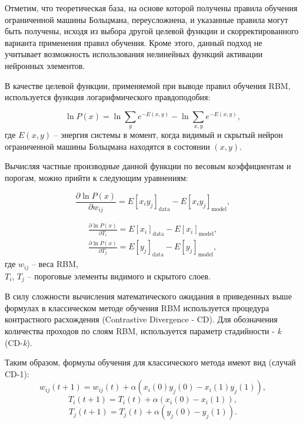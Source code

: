 \documentclass{thesisby}
\begin{document}
Отметим, что теоретическая база, на основе которой получены правила обучения ограниченной машины Больцмана, переусложнена, и указанные правила могут быть получены, исходя из выбора другой целевой функции и скорректированного варианта применения правил обучения. Кроме этого, данный подход не учитывает возможность использования нелинейных функций активации нейронных элементов.

В качестве целевой функции, применяемой при выводе правил обучения RBM, используется функция логарифмического правдоподобия:
 
\begin{equation*}
    \ln{P(x)} = \ln{\sum_y e^{-E(x, y)}} - \ln{\sum_{x,y} e^{-E(x, y)}},
\end{equation*}
где $E(x, y)$ -- энергия системы в момент, когда видимый и скрытый нейрон ограниченной машины Больцмана находятся в состоянии $(x, y)$.
	
Вычисляя частные производные данной функции по весовым коэффициентам и порогам, можно прийти к следующим уравнениям:

\begin{equation*}
    \label{grad_weights}
	\frac{\partial \ln P(x)}{\partial w_{ij}}=E\left[x_iy_j\right]_{\text{data}}-E\left[x_iy_j\right]_{\text{model}},
\end{equation*}
 
\begin{equation*}
\label{grad_biases}
\begin{aligned}
	\frac{\partial \ln P(x)}{\partial T_i}=E\left[x_i\right]_{\text{data}}-E\left[x_i\right]_{\text{model}},\\
	\frac{\partial \ln P(x)}{\partial T_j}=E\left[y_j\right]_{\text{data}}-E\left[y_j\right]_{\text{model}},
\end{aligned}
\end{equation*}
где $w_{ij}$ -- веса RBM,\\
$T_i$, $T_j$ -- пороговые элементы видимого и скрытого слоев.

В силу сложности вычисления математического ожидания в приведенных выше формулах в классическом методе обучения RBM используется процедура контрастного расхождения (Contrastive Divergence - CD). Для обозначения количества проходов по слоям RBM, используется параметр стадийности - \textit{k} (CD-\textit{k}).

Таким образом, формулы обучения для классического метода имеют вид (случай CD-1):
\begin{equation*}
	w_{ij}(t+1)=w_{ij}(t)+\alpha(x_i(0)y_j(0)-x_i(1)y_j(1)),
\end{equation*}
\begin{equation*}
    T_i(t+1)=T_i(t)+\alpha(x_i(0)-x_i(1)),
\end{equation*}
\begin{equation*}
    T_j(t+1)=T_j(t)+\alpha(y_j(0)-y_j(1)).
\end{equation*}
 
\end{document}
